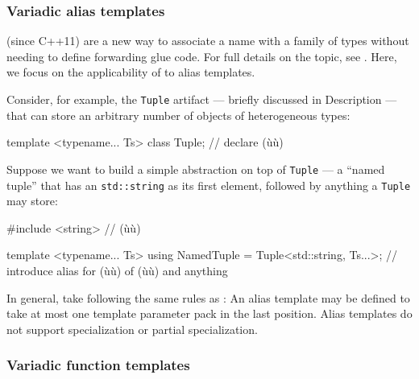 \subsubsection[Variadic alias templates]{Variadic alias templates}\label{variadic-alias-templates}

 (since C++11) are a new way to associate a name
with a family of types without needing to define forwarding glue code.
For full details on the topic, see . Here,
we focus on the applicability of  to
alias templates.

Consider, for example, the \lstinline!Tuple! artifact --- briefly discussed
in {Description} --- that can store an arbitrary number of objects of
heterogeneous types:

\begin{emcppslisting}[emcppsbatch=e12]
template <typename... Ts> class Tuple;  // declare (ù{}ù)
\end{emcppslisting}
    

\noindent Suppose we want to build a simple abstraction on top of \lstinline!Tuple!
--- a ``named tuple'' that has an \lstinline!std::string! as its first
element, followed by anything a \lstinline!Tuple! may store:

\begin{emcppslisting}[emcppsbatch=e12]
#include <string>  // (ù{}ù)

template <typename... Ts>
using NamedTuple = Tuple<std::string, Ts...>;
    // introduce alias for (ù{}ù) of (ù{}ù) and anything
\end{emcppslisting}
    

\noindent In general,  take  following the same rules as : An alias template may be defined to take at most one
template parameter pack in the last position. Alias templates do not
support specialization or partial specialization.

\subsubsection[Variadic function templates]{Variadic function templates}\label{variadic-function-templates}


